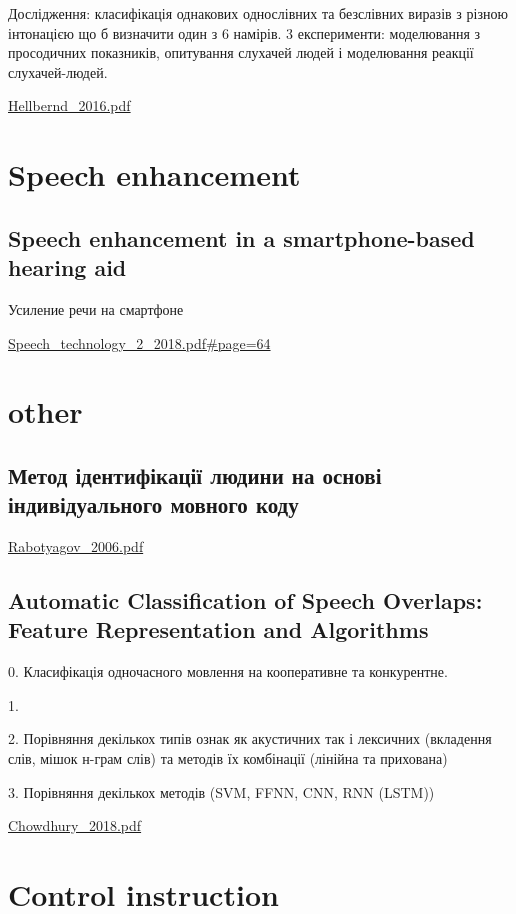 Дослідження: класифікація однакових однослівних та безслівних виразів з різною інтонацією що б визначити один з 6 намірів. 3 експерименти: моделювання з просодичних показників, опитування слухачей людей і моделювання реакції слухачей-людей.

\url{Hellbernd_2016.pdf}\cite{Hellbernd_2016}


\section{Speech enhancement}

\subsection{Speech enhancement in a smartphone-based hearing aid}

Усиление речи на смартфоне

\url{Speech_technology_2_2018.pdf#page=64}\cite{Vashkevich_2018}

\section{other}

\subsection{Метод ідентифікації людини на основі індивідуального мовного коду}

\url{Rabotyagov_2006.pdf}\cite{Rabotyagov_2006}

\subsection{Automatic Classification of Speech Overlaps: Feature Representation and Algorithms}

0. Класифікація одночасного мовлення на кооперативне та конкурентне.

1. 

2. Порівняння декількох типів ознак як акустичних так і лексичних (вкладення слів, мішок н-грам слів) та методів їх комбінації (лінійна та прихована)

3. Порівняння декількох методів (SVM, FFNN, CNN, RNN (LSTM))

\url{Chowdhury_2018.pdf}\cite{Chowdhury_2018}

\section{Control instruction}

